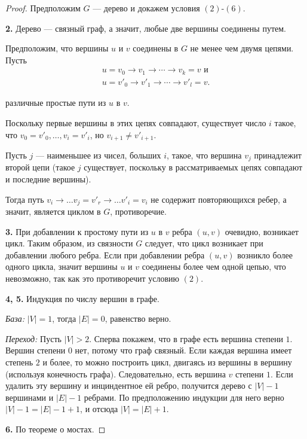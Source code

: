 \begin{proof}
    Предположим $G$ --- дерево и докажем условия $(2)$-$(6)$.

    \textbf{2.} Дерево --- связный граф, а значит, любые две вершины соединены путем.

    Предположим, что вершины $u$ и $v$ соединены в $G$ не менее чем двумя цепями. Пусть 
    \begin{gather*}
        u = v_0 \to v_1 \to \cdots \to v_k = v \text{ и}\\
        u = v'_0 \to v'_1 \to \cdots \to v'_{l} = v.
    \end{gather*}
    
    различные простые пути из $u$ в $v$.

    Поскольку первые вершины в этих цепях совпадают, существует число $i$ такое, что $v_0 = v'_0, \ldots, v_i = v'_i$, но $v_{i + 1} \neq v'_{i + 1}$.

    Пусть $j$ --- наименьшее из чисел, больших $i$, такое, что вершина $v_j$ принадлежит второй цепи (такое $j$ существует, поскольку в рассматриваемых цепях совпадают и последние вершины).

    Тогда путь $v_i \to \ldots v_j = v'_r \to \ldots v'_i = v_i$ не содержит повторяющихся ребер, а значит, является циклом в $G$, противоречие.

    \textbf{3.} При добавлении к простому пути из $u$ в $v$ ребра $(u, v)$ очевидно, возникает цикл. Таким образом, из связности $G$ следует, что цикл возникает при добавлении любого ребра. Если при добавлении ребра $(u, v)$ возникло более одного цикла, значит вершины $u$ и $v$ соединены более чем одной цепью, что невозможно, так как это противоречит условию $(2)$.

    \textbf{4, 5.} Индукция по числу вершин в графе.

    \textsl{База:} $|V| = 1$, тогда $|E| = 0$, равенство верно.

    \textsl{Переход:} Пусть $|V| > 2$. Сперва покажем, что в графе есть вершина степени $1$. Вершин степени $0$ нет, потому что граф связный. Если каждая вершина имеет степень $2$ и более, то можно построить цикл, двигаясь из вершины в вершину (используя конечность графа). Следовательно, есть вершина $v$ степени $1$. Если удалить эту вершину и инциндентное ей ребро, получится дерево с $|V| - 1$ вершинами и $|E| - 1$ ребрами. По предположению индукции для него верно $|V| - 1 = |E| - 1 + 1$, и отсюда $|V| = |E| + 1$.
    
    \textbf{6.} По теореме о мостах.


\end{proof}
